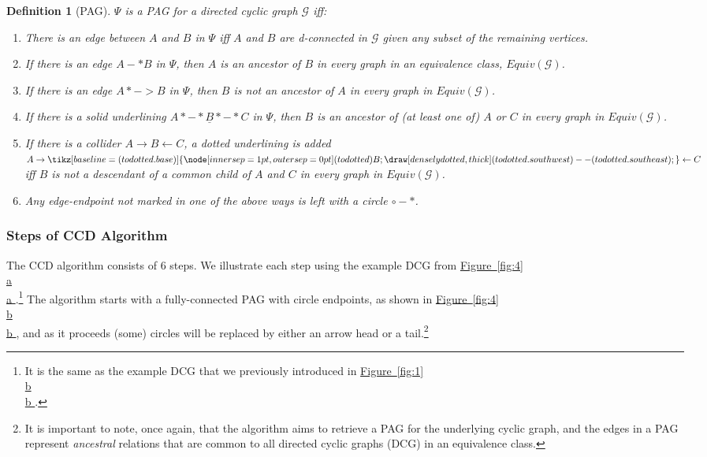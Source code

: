 \documentclass[twoside, 11pt]{article}
\newcommand{\udensdot}[1]{%
    \tikz[baseline=(todotted.base)]{
        \node[inner sep=1pt,outer sep=0pt] (todotted) {#1};
        \draw[densely dotted, thick] (todotted.south west) -- (todotted.south east);
    }%
}%
\newcommand*{\figref}[2][]{%
  \hyperref[{fig:#2}]{%
    Figure~\ref*{fig:#2}%
    \ifx\\#1\\%
    \else
      #1%
    \fi
  }%
}
\newtheorem{definition}{Definition}
\begin{document}
\begin{definition} [PAG] \label{def: def2}
\textup{$\Psi$ is a PAG for a directed cyclic graph $\mathcal{G}$ iff:}
\begin{enumerate}[nolistsep]
    \item \textup{There is an edge between $A$ and $B$ in $\Psi$ iff $A$ and $B$ are d-connected in $\mathcal{G}$ given any subset of the remaining vertices.}
    
    \item \textup{If there is an edge $A -* B$ in $\Psi$, then $A$ is an ancestor of $B$ in every graph in an equivalence class, $Equiv(\mathcal{G})$.}

    \item \textup{If there is an edge $A *-> B$ in $\Psi$, then $B$ is \textit{not} an ancestor of $A$ in every graph in $Equiv(\mathcal{G})$.}

    \item \textup{If there is a solid underlining $A *-*\underline{B}*-*C$ in $\Psi$, then $B$ is an ancestor of (at least one of) $A$ or $C$ in every graph in $Equiv(\mathcal{G})$.}

    \item \textup{If there is a collider $A \rightarrow B \leftarrow C$, a dotted underlining is added $A \rightarrow \udensdot{B} \leftarrow C$ iff $B$ is \textit{not} a descendant of a common child of $A$ and $C$ in every graph in $Equiv(\mathcal{G})$.}
    \item \textup{Any edge-endpoint not marked in one of the above ways is left with a circle $\circ-*$.}
    
\end{enumerate}
\end{definition}

\subsubsection{Steps of CCD Algorithm}
The CCD algorithm consists of 6 steps. We illustrate each step using the example DCG from \figref[a]{4}.\footnote{It is the same as the example DCG that we previously introduced in \figref[b]{1}.} The algorithm starts with a fully-connected PAG with circle endpoints, as shown in \figref[b]{4}, and as it proceeds (some) circles will be replaced by either an arrow head or a tail.\footnote{It is important to note, once again, that the algorithm aims to retrieve a PAG for the underlying cyclic graph, and the edges in a PAG represent \textit{ancestral} relations that are common to all directed cyclic graphs (DCG) in an equivalence class.}
\end{document}
